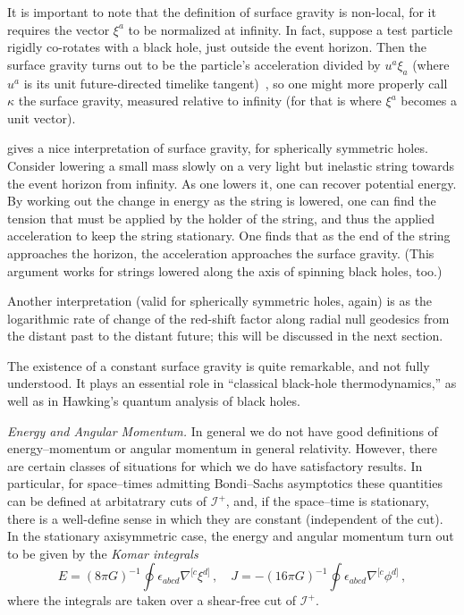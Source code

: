 \documentclass[
%
draft    %
,numberedheadings 
,bibliocites
  ]
  {aipproc}
\newcommand{\scrif}{{{\mathscr I}^{+}}}
\begin{document}
It is important to note that the definition of surface gravity is non-local, for it requires the vector $\xi ^a$ to be normalized at infinity.  In fact, suppose a test particle rigidly co-rotates with a black hole, just outside the event horizon.  Then the surface gravity turns out to be the particle's acceleration divided by $u^a\xi _a$ (where $u^a$ is its unit future-directed timelike tangent)~\citep{Bardeen:1973gs}, so one might more properly call $\kappa$ the surface gravity, measured relative to infinity (for that is where $\xi ^a$ becomes a unit vector).

\citet{Wald:1984} gives a nice interpretation of surface gravity, for spherically symmetric holes.  Consider lowering a small mass slowly on a very light but inelastic string towards the event horizon from infinity.  As one lowers it, one can recover potential energy.  By working out the change in energy as the string is lowered, one can find the tension that must be applied by the holder of the string, and thus the applied acceleration to keep the string stationary.  One finds that as the end of the string approaches the horizon, the acceleration approaches the surface gravity.  (This argument works for strings lowered along the axis of spinning black holes, too.)

Another interpretation (valid for spherically symmetric holes, again) is as the logarithmic rate of change of the red-shift factor along radial null geodesics from the distant past to the distant future; this will be discussed in the next section.

The existence of a constant surface gravity is quite remarkable, and not fully understood.  It plays an essential role in ``classical black-hole thermodynamics,'' as well as in Hawking's quantum analysis of black holes.

{\em Energy and Angular Momentum.}
In general we do not have good definitions of energy--momentum or angular momentum in general relativity.  However, there are certain classes of situations for which we do have satisfactory results.  In particular, for space--times admitting Bondi--Sachs asymptotics these quantities can be defined at arbitatrary cuts of $\scrif$, and, if the space--time is stationary, there is a well-define sense in which they are constant (independent of the cut).  In the stationary axisymmetric case, the energy and angular momentum turn out to be given by the {\em Komar integrals}
\begin{equation}
  E=(8\pi G)^{-1}\oint \epsilon _{abcd}\nabla ^{[c}\xi ^{d]}
  \, ,\quad
  J=-(16\pi G)^{-1}\oint \epsilon _{abcd}\nabla ^{[c}\phi ^{d]}\, ,
\end{equation}
where the integrals are taken over a shear-free cut of $\scrif$.
\end{document}
